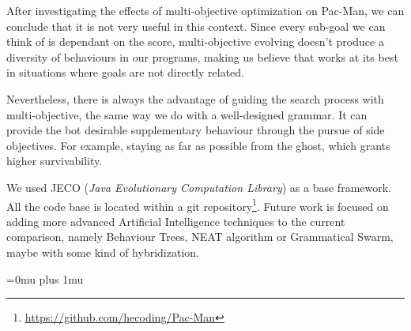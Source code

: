 \documentclass{llncs}
\begin{document}
After investigating the effects of multi-objective optimization on Pac-Man, we can conclude that it is not very useful in this context. Since every sub-goal we can think of is dependant on the score, multi-objective evolving doesn't produce a diversity of behaviours in our programs, making us believe that works at its best in situations where goals are not directly related.

Nevertheless, there is always the advantage of guiding the search process with multi-objective, the same way we do with a well-designed grammar. It can provide the bot desirable supplementary behaviour through the pursue of side objectives. For example, staying as far as possible from the ghost, which grants higher survivability.

We used JECO (\textit{Java Evolutionary Computation Library}) as a base framework. All the code base is located within a git repository\footnote{\url{https://github.com/hecoding/Pac-Man}}. Future work is focused on adding more advanced Artificial Intelligence techniques to the current comparison, namely Behaviour Trees, NEAT algorithm or Grammatical Swarm, maybe with some kind of hybridization.


\Urlmuskip=0mu plus 1mu %

%

\end{document}
